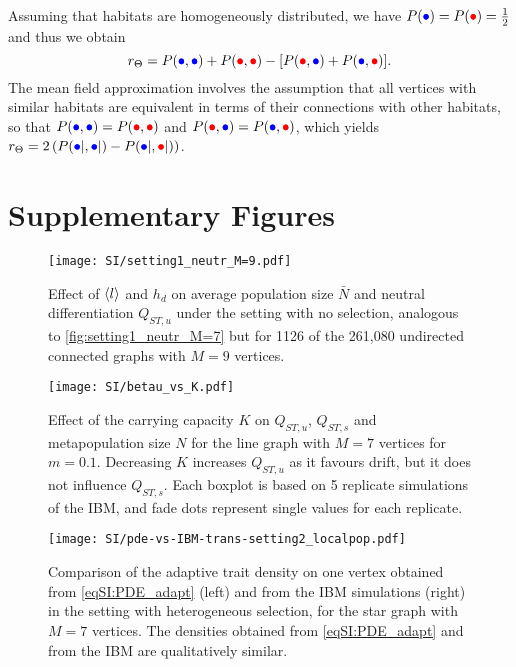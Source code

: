 Assuming that habitats are homogeneously distributed, we have $P(\bcirc) = P(\rcirc) = \frac{1}{2}$ and thus we obtain
\begin{equation}\label{eqSI:r_theta_homo}
  r_\Theta =   P(\bcirc,\bcirc) + P(\rcirc,\rcirc)   -  [ P(\rcirc,\bcirc) + P(\bcirc,\rcirc)].
\end{equation}
%
The mean field approximation involves the assumption that all vertices with similar habitats are equivalent in terms of their connections with other habitats, so that $P(\bcirc,\bcirc) = P(\rcirc,\rcirc)$ and $P(\rcirc,\bcirc) = P(\bcirc,\rcirc)$, which yields $r_\Theta = 2 \left( P({\bcirc|},{\bcirc|}) - P({\bcirc|},{\rcirc|}) \right)$.


\clearpage

\section{Supplementary Figures}

\begin{figure}[ht]
  \centerline{
      \texttt{[image: SI/setting1\_neutr\_M=9.pdf]} 
  }
  \caption{Effect of $\langle l \rangle$ and $h_d$ on average population size $\bar{N}$ and neutral differentiation $Q_{ST,u}$ under the setting with no selection, analogous to \cref{fig:setting1_neutr_M=7} but for 1126 of the 261,080 undirected connected graphs with $M=9$ vertices.}
  \label{figSI:setting1_neutr_M=9}
\end{figure}

\begin{figure}[ht]
  \centering
    \texttt{[image: SI/betau\_vs\_K.pdf]}
    \caption{Effect of the carrying capacity $K$ on $Q_{ST,u}$, $Q_{ST,s}$ and metapopulation size $N$ for the line graph with $M=7$ vertices for $m=0.1$. Decreasing $K$ increases $Q_{ST,u}$ as it favours drift, but it does not influence $Q_{ST,s}$. Each boxplot is based on 5 replicate simulations of the IBM, and fade dots represent single values for each replicate.}\label{betau_vs_K}
\end{figure}


\begin{figure}[ht]
  \centerline{
      \texttt{[image: SI/pde-vs-IBM-trans-setting2\_localpop.pdf]}}
    \caption{ Comparison of the adaptive trait density on one vertex obtained from \cref{eqSI:PDE_adapt} (left) and from the IBM simulations (right) in the setting with heterogeneous selection, for the star graph with $M=7$ vertices. The densities obtained from \cref{eqSI:PDE_adapt} and from the IBM are qualitatively similar.}
    \label{figSI:pde-vs-IBM-trans-setting2_localpop}
\end{figure}

